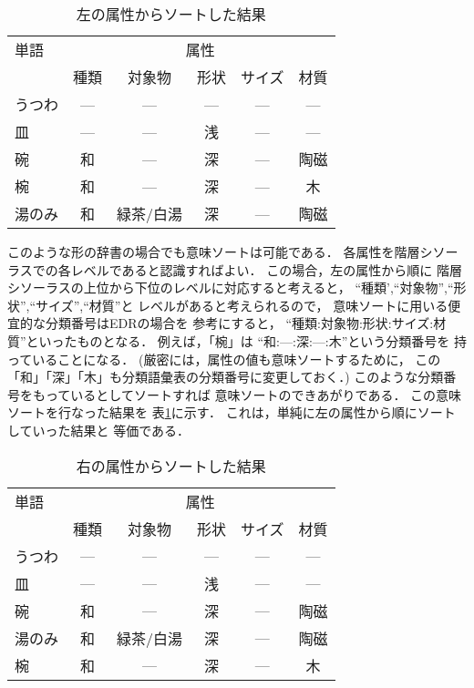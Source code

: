 \begin{table}[t]
  \caption{左の属性からソートした結果}
  \label{tab:ipal_hukusuu_zokusei_rei_hidari}
  \begin{center}
\small\renewcommand{\arraystretch}{}
\begin{tabular}[c]{|l|ccccc|}\hline
単語    & \multicolumn{5}{c|}{属性}\\\cline{2-6}
        & \multicolumn{1}{c}{種類}& \multicolumn{1}{c}{対象物} & \multicolumn{1}{c}{形状} & \multicolumn{1}{c}{サイズ} & \multicolumn{1}{c|}{材質}\\\hline
うつわ  & --- & --- & --- & --- & ---\\
皿      & --- & --- & 浅  & --- & ---\\
碗      & 和  & --- & 深  & --- & 陶磁\\
椀      & 和  & --- & 深  & --- & 木  \\
湯のみ  & 和  & 緑茶/白湯 & 深  & --- & 陶磁 \\\hline
\end{tabular}
\end{center}
\end{table}

このような形の辞書の場合でも意味ソートは可能である．
各属性を階層シソーラスでの各レベルであると認識すればよい．
この場合，左の属性から順に
階層シソーラスの上位から下位のレベルに対応すると考えると，
``種類',``対象物'',``形状'',``サイズ'',``材質''と
レベルがあると考えられるので，
意味ソートに用いる便宜的な分類番号はEDRの場合を
参考にすると，
``種類:対象物:形状:サイズ:材質''といったものとなる．
例えば，「椀」は ``和:---:深:---:木''という分類番号を
持っていることになる．
(厳密には，属性の値も意味ソートするために，
この「和」「深」「木」も分類語彙表の分類番号に変更しておく．)
このような分類番号をもっているとしてソートすれば
意味ソートのできあがりである．
この意味ソートを行なった結果を
表\ref{tab:ipal_hukusuu_zokusei_rei_hidari}に示す．
これは，単純に左の属性から順にソートしていった結果と
等価である．

\begin{table}[t]
  \caption{右の属性からソートした結果}
  \label{tab:ipal_hukusuu_zokusei_rei_migi}
  \begin{center}
\small\renewcommand{\arraystretch}{}
\begin{tabular}[c]{|l|ccccc|}\hline
単語    & \multicolumn{5}{c|}{属性}\\\cline{2-6}
        & \multicolumn{1}{c}{種類}& \multicolumn{1}{c}{対象物} & \multicolumn{1}{c}{形状} & \multicolumn{1}{c}{サイズ} & \multicolumn{1}{c|}{材質}\\\hline
うつわ  & --- & --- & --- & --- & ---\\
皿      & --- & --- & 浅  & --- & ---\\
碗      & 和  & --- & 深  & --- & 陶磁\\
湯のみ  & 和  & 緑茶/白湯 & 深  & --- & 陶磁 \\
椀      & 和  & --- & 深  & --- & 木  \\\hline
\end{tabular}
\end{center}
\end{table}

